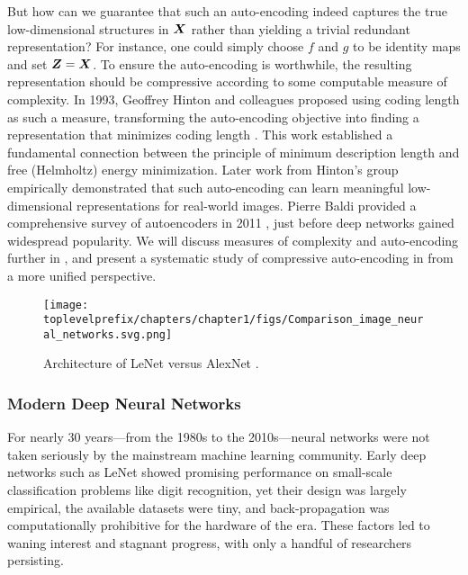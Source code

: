 \documentclass[../../book-main.tex]{subfiles}
\begin{document}
But how can we guarantee that such an auto-encoding indeed captures the true low-dimensional structures in $\bm{X}$ rather than yielding a trivial redundant representation? For instance, one could simply choose $f$ and $g$ to be identity maps and set $\bm{Z} = \bm{X}$. To ensure the auto-encoding is worthwhile, the resulting representation should be compressive according to some computable measure of complexity. In 1993, Geoffrey Hinton and colleagues proposed using coding length as such a measure, transforming the auto-encoding objective into finding a representation that minimizes coding length \cite{Hinton-1993}. This work established a fundamental connection between the principle of minimum description length \cite{Rissanen-1978} and free (Helmholtz) energy minimization. Later work from Hinton's group \cite{Hinton504} empirically demonstrated that such auto-encoding can learn meaningful low-dimensional representations for real-world images. Pierre Baldi provided a comprehensive survey of autoencoders in 2011 \cite{Baldi2011}, just before deep networks gained widespread popularity. We will discuss measures of complexity and auto-encoding further in , and present a systematic study of compressive auto-encoding in  from a more unified perspective.

\begin{figure}
    \centering
    \texttt{[image: \\toplevelprefix/chapters/chapter1/figs/Comparison\_image\_neural\_networks.svg.png]}
    \caption{Architecture of LeNet \cite{LeCun-1989} versus AlexNet \cite{krizhevsky2012imagenet}.}
    \label{fig:LeNet-AlexNet}
\end{figure}


\subsubsection{Modern Deep Neural Networks}
For nearly 30 years---from the 1980s to the 2010s---neural networks were not taken seriously by the mainstream machine learning community. Early deep networks such as LeNet showed promising performance on small-scale classification problems like digit recognition, yet their design was largely empirical, the available datasets were tiny, and back-propagation was computationally prohibitive for the hardware of the era. These factors led to waning interest and stagnant progress, with only a handful of researchers persisting.
\end{document}
